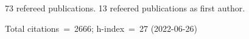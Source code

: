 73 refereed publications. 13 refeered publications as first author.

Total citations~=~2666; h-index~=~27 (2022-06-26)